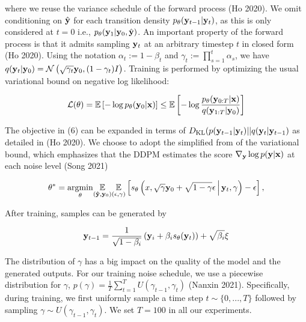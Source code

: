 \documentclass{article}
\begin{document}
where we reuse the variance schedule of the forward process (Ho 2020). We omit conditioning on $\hat{\bold{y}}$ for each transition density $p_{\theta}(\bold{y}_{t-1}|\bold{y}_{t})$, as this is only considered at $t=0$ i.e., $p_{\theta}(\bold{y}_{1}|\bold{y}_{0},\hat{\bold{y}})$. An important property of the forward process is that it admits sampling $\bold{y}_t$ at an arbitrary timestep $t$ in closed form (Ho 2020). Using the notation $\alpha_t := 1 - \beta_t$ and $\gamma_t := \prod_{s=1}^{t} \alpha_s$, we have $q(\bold{y}_t|\bold{y}_0) = \mathcal{N} \left(\sqrt{\gamma_{t}} \bold{y}_{0}, (1 - \gamma_t)I \right)$. Training is performed by optimizing the usual variational bound on negative log likelihood:

\begin{equation}
\mathcal{L}(\theta) = \mathbb{E}\left[-\log p_{\theta}(\bold{y}_{0}|\bold{x})\right] \leq  \mathbb{E}\left[-\log \frac{p_{\theta}(\bold{y}_{0:T}|\bold{x})}{q(\bold{y}_{1:T}|\bold{y}_{0})}\right]
\end{equation}

The objective in (6) can be expanded in terms of $D_{\mathrm{KL}}(p(\bold{y}_{t-1}|\bold{y}_{t})|| q(\bold{y}_{t}|\bold{y}_{t-1})$ as detailed in (Ho 2020). We choose to adopt the simplified from of the variational bound, which emphasizes that the DDPM estimates the score $\nabla_{\bold{y}}\log p(\bold{y}|\bold{x})$ at each noise level (Song 2021)

\begin{equation}
\theta^{*} = \underset{\theta}{\mathrm{argmin}} \underset{(\bold{\hat{y}},\bold{y}_{0})}{\mathbb{E}}\underset{(\epsilon,\gamma)}{\mathbb{E}} \left[ s_{\theta}\left(x, \sqrt{\gamma} \bold{y}_0 + \sqrt{1 - \gamma} \epsilon \, \middle|\, \bold{y}_{t}, \gamma\right) - \epsilon \right],
\end{equation}

After training, samples can be generated by 

\begin{equation}
\bold{y}_{t-1} = \frac{1}{\sqrt{1-\beta_{i}}}\left(\bold{y}_{i} + \beta_{i}s_{\theta}(\bold{y}_{t})\right) + \sqrt{\beta_{i}}\bold{\xi}
\end{equation}

The distribution of $\gamma$ has a big impact on the quality of the model and the generated outputs. For our training noise schedule, we use a piecewise distribution for $\gamma$, $p(\gamma) = \frac{1}{T}\sum_{t=1}^{T} U(\gamma_{t-1}, \gamma_t)$ (Nanxin 2021). Specifically, during training, we first uniformly sample a time step $t \sim \{0, ..., T\}$ followed by sampling $\gamma \sim U(\gamma_{t-1}, \gamma_t)$. We set $T = 100$ in all our experiments.
\end{document}
